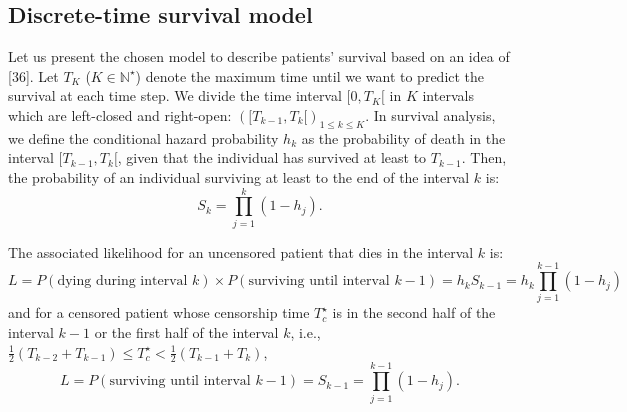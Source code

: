 \documentclass[a4paper,10pt]{article}
\begin{document}
\subsection{Discrete-time survival model}
Let us present the chosen model to describe patients' survival based on an idea of [36]. Let $T_K$ ($K \in \mathbb{N}^\star$) denote the maximum time until we want to predict the survival at each time step. We divide the time interval $[0, T_K[$ in $K$ intervals which are left-closed and right-open: $([T_{k-1}, T_k[)_{1\le k\le K}$. In survival analysis, we define the conditional hazard probability $h_k$ as the probability of death in the interval $[T_{k-1}, T_k[$, given that the individual has survived at least to $T_{k-1}$. Then, the probability of an individual surviving at least to the end of the interval $k$ is:
\begin{equation}
S_k = \prod_{j=1}^{k} (1 - h_j).
\end{equation}

The associated likelihood for an uncensored patient that dies in the interval $k$ is:
\[ L = P(\text{dying during interval } k) \times P(\text{surviving until interval } k-1) = h_k S_{k-1} = h_k \prod_{j=1}^{k-1} (1 - h_j) \]
and for a censored patient whose censorship time $T^\star_c$ is in the second half of the interval $k-1$ or the first half of the interval $k$, i.e., $\frac{1}{2}(T_{k-2} + T_{k-1}) \le T^\star_c < \frac{1}{2}(T_{k-1} + T_k)$,
\[ L = P(\text{surviving until interval } k-1) = S_{k-1} = \prod_{j=1}^{k-1} (1 - h_j). \]
\end{document}
